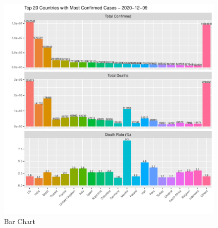 \newpage
\begin{figure}[h!]
    \centering
    \includegraphics[width=\linewidth]{images/bar_chart.pdf}
    \caption{Bar Chart}
    \label{fig:bar_chart}
\end{figure}

